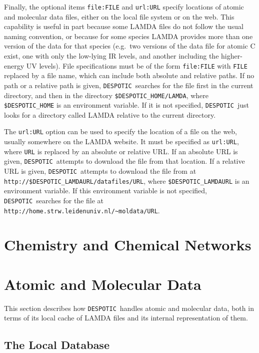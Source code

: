 \documentclass[12pt]{article}
\newcommand{\despotic}{\texttt{DESPOTIC}}
\begin{document}
Finally, the optional items \verb=file:FILE= and \verb=url:URL= specify locations of atomic and molecular data files, either on the local file system or on the web. This capability is useful in part because some LAMDA files do not follow the usual naming convention, or because for some species LAMDA provides more than one version of the data for that species (e.g.~two versions of the data file for atomic C exist, one with only the low-lying IR levels, and another including the higher-energy UV levels). File specifications must be of the form \verb=file:FILE= with \verb=FILE= replaced by a file name, which can include both absolute and relative paths. If no path or a relative path is given, \despotic\ searches for the file first in the current directory, and then in the directory \verb=$DESPOTIC_HOME/LAMDA=, where \verb=$DESPOTIC_HOME= is an environment variable. If it is not specified, \despotic\ just looks for a directory called LAMDA relative to the current directory.

The \verb=url:URL= option can be used to specify the location of a file on the web, usually somewhere on the LAMDA website. It must be specified as \verb=url:URL=, where \verb=URL= is replaced by an absolute or relative URL. If an absolute URL is given, \despotic\ attempts to download the file from that location. If a relative URL is given, \despotic\ attempts to download the file from at \verb=http://$DESPOTIC_LAMDAURL/datafiles/URL=, where \verb=$DESPOTIC_LAMDAURL= is an environment variable. If this environment variable is not specified, \despotic\ searches for the file at \verb=http://home.strw.leidenuniv.nl/~moldata/URL=.

\clearpage

\section{Chemistry and Chemical Networks}
\label{sec:chem}

\clearpage

\section{Atomic and Molecular Data}
\label{sec:lamda}

This section describes how \despotic\ handles atomic and molecular data, both in terms of its local cache of LAMDA files and its internal representation of them.

\subsection{The Local Database}
\end{document}
